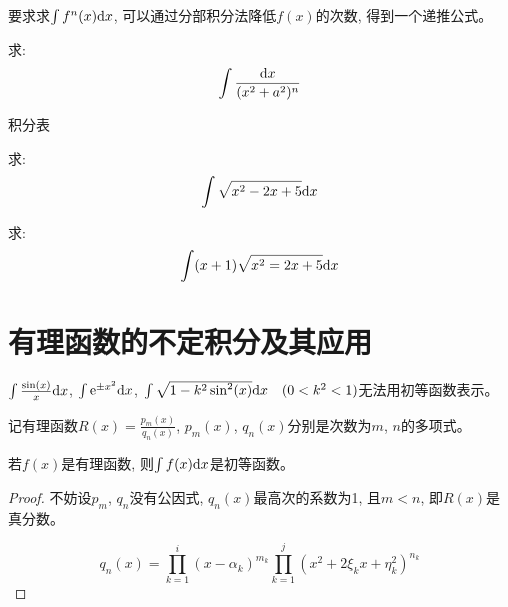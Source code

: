 \begin{remark}
    要求求$\int f^n(x) \mathrm{d} x$, 可以通过分部积分法降低$f(x)$的次数, 得到一个递推公式。
\end{remark}

\begin{example}
    求:
    \begin{equation}
        \int \frac{\mathrm{d} x}{(x^2+a^2)^n}
    \end{equation}
\end{example}
\begin{solution}
    
\end{solution}

积分表

\begin{example}
    求:
    \begin{equation*}
        \int \sqrt{x^2-2x+5} \mathrm{d} x
    \end{equation*}
\end{example}
\begin{solution}
    
\end{solution}

\begin{example}
    求:
    \begin{equation*}
        \int (x+1)\sqrt{x^2=2x+5} \mathrm{d} x
    \end{equation*}
\end{example}
\begin{solution}
    
\end{solution}

\section{有理函数的不定积分及其应用}
$\int \frac{\sin(x)}{x} \mathrm{d} x$, $\int \mathrm{e}^{\pm x^2} \mathrm{d} x$, $\int \sqrt{1-k^2\sin^2(x)} \mathrm{d} x \quad (0 < k^2 < 1)$无法用初等函数表示。

\begin{definition}[有理函数]
    记有理函数$R(x) = \frac{p_m(x)}{q_n(x)}$, $p_m(x)$, $q_n(x)$分别是次数为$m$, $n$的多项式。
\end{definition}

\begin{theorem}
    若$f(x)$是有理函数, 则$\int f(x) \mathrm{d} x$是初等函数。
\end{theorem}
\begin{proof}
    不妨设$p_m$, $q_n$没有公因式, $q_n(x)$最高次的系数为1, 且$m < n$, 即$R(x)$是真分数。

    \begin{equation*}
        q_n(x) = \prod_{k=1}^{i}(x-\alpha_k)^{m_k}\prod_{k=1}^{j}(x^2+2\xi_k x + \eta_k^2)^{n_k}
    \end{equation*}
\end{proof}

